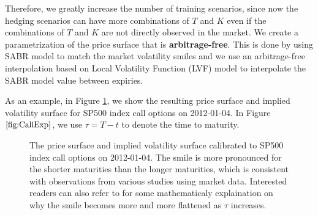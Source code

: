 Therefore, we greatly increase the number of training scenarios, since now the hedging scenarios can have more combinations of $T$ and $K$ even if the combinations of $T$ and $K$ are not directly observed in the market. 
We create a parametrization of the price surface that is \textbf{arbitrage-free}.  This is done by using SABR model to match the market volatility smiles and we use an arbitrage-free interpolation based on Local Volatility Function (LVF) model to interpolate the SABR model value between expiries.


As an example, in Figure \ref{fig:CaliExp}, we show the resulting price surface and implied  volatility surface for SP500 index call options  on 2012-01-04. In Figure $\ref{fig:CaliExp}$, we use $\tau=T-t$ to denote the time to maturity.  


\begin{figure}[htp!]
	\centering
	\caption{The price surface and implied volatility surface calibrated to SP500 index call options on 2012-01-04. The smile is more pronounced for the shorter maturities than the longer maturities, which is consistent with observations from various studies \cite{chance2017bias,rogers2010can} using market data. Interested readers can also refer to \cite{rogers2010can} for some mathematicaly explaination on why the smile becomes more and more flattened as $\tau$ increases.}
	\label{fig:CaliExp}
\end{figure}

